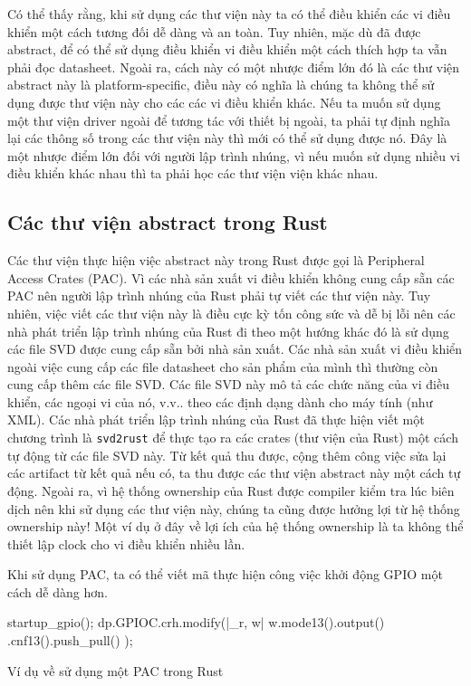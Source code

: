 Có thể thấy rằng, khi sử dụng các thư viện này ta có thể điều khiển các vi điều khiển một cách tương đối dễ dàng và an toàn.
Tuy nhiên, mặc dù đã được abstract, để có thể sử dụng điều khiển vi điều khiển một cách thích hợp ta vẫn phải đọc datasheet.
Ngoài ra, cách này có một nhược điểm lớn đó là các thư viện abstract này là platform-specific, điều này có nghĩa là chúng ta không thể sử dụng được thư viện này cho các các vi điều khiển khác.
Nếu ta muốn sử dụng một thư viện driver ngoài để tương tác với thiết bị ngoài, ta phải tự định nghĩa lại các thông số trong các thư viện này thì mới có thể sử dụng được nó.
Đây là một nhược điểm lớn đối với người lập trình nhúng, vì nếu muốn sử dụng nhiều vi điều khiển khác nhau thì ta phải học các thư viện viện khác nhau.

\subsection{Các thư viện abstract trong Rust}
Các thư viện thực hiện việc abstract này trong Rust được gọi là Peripheral Access Crates (PAC).
Vì các nhà sản xuất vi điều khiển không cung cấp sẵn các PAC nên người lập trình nhúng của Rust phải tự viết các thư viện này.
Tuy nhiên, việc viết các thư viện này là điều cực kỳ tốn công sức và dễ bị lỗi nên các nhà phát triển lập trình nhúng của Rust đi theo một hướng khác đó là sử dụng các file SVD được cung cấp sẵn bởi nhà sản xuất.
Các nhà sản xuất vi điều khiển ngoài việc cung cấp các file datasheet cho sản phẩm của mình thì thường còn cung cấp thêm các file SVD.
Các file SVD này mô tả các chức năng của vi điều khiển, các ngoại vi của nó, v.v.. theo các định dạng dành cho máy tính (như XML).
Các nhà phát triển lập trình nhúng của Rust đã thực hiện viết một chương trình là \texttt{svd2rust} để thực tạo ra các crates (thư viện của Rust) một cách tự động từ các file SVD này.
Từ kết quả thu được, cộng thêm công việc sửa lại các artifact từ kết quả nếu có,
ta thu được các thư viện abstract này một cách tự động.
Ngoài ra, vì hệ thống ownership của Rust được compiler kiểm tra lúc biên dịch nên khi sử dụng các thư viện này, chúng ta cũng được hưởng lợi từ hệ thống ownership này!
Một ví dụ ở đây về lợi ích của hệ thống ownership là ta không thể thiết lập clock cho vi điều khiển nhiều lần.

Khi sử dụng PAC, ta có thể viết mã thực hiện công việc khởi động GPIO một cách dễ dàng hơn.
\begin{listing}[ht]
\begin{rustcode}
startup_gpio();
dp.GPIOC.crh.modify(|_r, w| {
    w.mode13().output()
     .cnf13().push_pull()
});
\end{rustcode}
\caption{Ví dụ về sử dụng một PAC trong Rust}
\end{listing}

